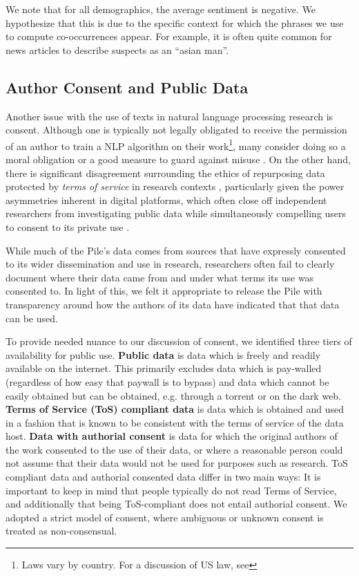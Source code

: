 \documentclass[11pt,a4paper]{article}
\begin{document}
We note that for all demographics, the average sentiment is negative. We hypothesize that this is due to the specific context for which the phrases we use to compute co-occurrences appear. For example, it is often quite common for news articles to describe suspects as an ``asian man''.

\subsection{Author Consent and Public Data}

Another issue with the use of texts in natural language processing research is consent. Although one is typically not legally obligated to receive the permission of an author to train a NLP algorithm on their work\footnote{Laws vary by country. For a discussion of US law, see }, many consider doing so a moral obligation or a good measure to guard against misuse \citep{ethics-consent,pyrrhic-cv}. On the other hand, there is significant disagreement surrounding the ethics of repurposing data protected by \textit{terms of service} in research contexts \cite{beyondthebelmont, norobots}, particularly given the power asymmetries inherent in digital platforms, which often close off independent researchers from investigating public data while simultaneously compelling users to consent to its private use \cite{overcomingtos}.

While much of the Pile's data comes from sources that have expressly consented to its wider dissemination and use in research, researchers often fail to clearly document where their data came from and under what terms its use was consented to. In light of this, we felt it appropriate to release the Pile with transparency around how the authors of its data have indicated that that data can be used.

To provide needed nuance to our discussion of consent, we identified three tiers of availability for public use. \textbf{Public data} is data which is freely and readily available on the internet. This primarily excludes data which is pay-walled (regardless of how easy that paywall is to bypass) and data which cannot be easily obtained but can be obtained, e.g. through a torrent or on the dark web. \textbf{Terms of Service (ToS) compliant data} is data which is obtained and used in a fashion that is known to be consistent with the terms of service of the data host. \textbf{Data with authorial consent} is data for which the original authors of the work consented to the use of their data, or where a reasonable person could not assume that their data would not be used for purposes such as research. ToS compliant data and authorial consented data differ in two main ways: It is important to keep in mind that people typically do not read Terms of Service, and additionally that being ToS-compliant does not entail authorial consent. We adopted a strict model of consent, where ambiguous or unknown consent is treated as non-consensual.
\end{document}
